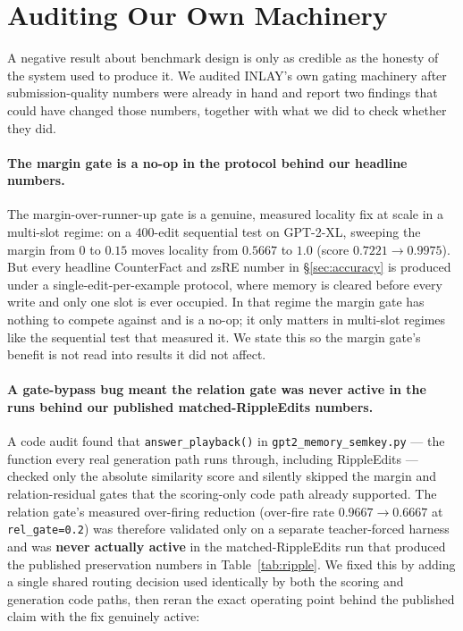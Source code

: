 \documentclass[11pt]{article}
\begin{document}
\section{Auditing Our Own Machinery}
\label{sec:audit}

A negative result about benchmark design is only as credible as the honesty
of the system used to produce it. We audited INLAY's own gating machinery
after submission-quality numbers were already in hand and report two
findings that could have changed those numbers, together with what we did to
check whether they did.

\paragraph{The margin gate is a no-op in the protocol behind our headline
numbers.} The margin-over-runner-up gate is a genuine, measured locality fix
at scale in a multi-slot regime: on a $400$-edit sequential test on
GPT-2-XL, sweeping the margin from $0$ to $0.15$ moves locality from
$0.5667$ to $1.0$ (score $0.7221 \to 0.9975$). But every headline
CounterFact and zsRE number in \S\ref{sec:accuracy} is produced under a
single-edit-per-example protocol, where memory is cleared before every
write and only one slot is ever occupied. In that regime the margin gate has
nothing to compete against and is a no-op; it only matters in multi-slot
regimes like the sequential test that measured it. We state this so the
margin gate's benefit is not read into results it did not affect.

\paragraph{A gate-bypass bug meant the relation gate was never active in the
runs behind our published matched-RippleEdits numbers.} A code audit found
that \texttt{answer\_playback()} in \texttt{gpt2\_memory\_semkey.py} --- the
function every real generation path runs through, including RippleEdits ---
checked only the absolute similarity score and silently skipped the margin
and relation-residual gates that the scoring-only code path already
supported. The relation gate's measured over-firing reduction (over-fire
rate $0.9667 \to 0.6667$ at \texttt{rel\_gate=0.2}) was therefore validated
only on a separate teacher-forced harness and was \textbf{never actually
active} in the matched-RippleEdits run that produced the published
preservation numbers in Table~\ref{tab:ripple}. We fixed this by adding a
single shared routing decision used identically by both the scoring and
generation code paths, then reran the exact operating point behind the
published claim with the fix genuinely active:
\end{document}
